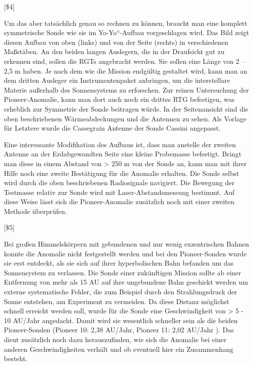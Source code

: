 \bigskip

[\$4]

Um das aber tats\"achlich genau so rechnen zu k\"onnen, braucht man
eine komplett symmetrische Sonde wie sie im
{\quotedblbase}Yo-Yo``-Aufbau vorgeschlagen wird. Das Bild zeigt diesen
Aufbau von oben (links) und von der Seite (rechts) in verschiedenen
Ma{\ss}st\"aben. An den beiden langen Auslegern, die in der Draufsicht
gut zu erkennen sind, sollen die RGTs ange\-bracht werden. Sie sollen
eine L\"ange von 2 -- 2,5 m haben. Je nach dem wie die Mission
endg\"ultig gestaltet wird, kann man an dem dritten Ausleger ein
Instrumentenpaket an\-bringen, um die interstellare Materie
au{\ss}erhalb des Sonnensystems zu erforschen. Zur rei\-nen
Untersuchung der Pioneer-Anomalie, kann man dort auch noch ein drittes
RTG befestigen, was erheblich zur Symmetrie der Sonde beitragen
w\"urde. In der Seitenansicht sind die oben beschriebenen
W\"armeabdeckungen und die Antennen zu sehen. Als Vorlage f\"ur
Letztere wurde die Cassegrain Antenne der Sonde Cassini angepasst.


\bigskip

Eine interessante Modifikation des Aufbaus ist, dass man anstelle der
zweiten Antenne an der Erdabgewandten Seite eine kleine Probemasse
befestigt. Bringt man diese in einem Abstand von {\textgreater} 250 m
von der Sonde an, kann man mit ihrer Hilfe noch eine zweite
Best\"a\-tigung f\"ur die Anomalie erhalten. Die Sonde selbst wird
durch die oben beschriebenen Ra\-diosignale navigiert. Die Bewegung der
Testmasse relativ zur Sonde wird mit Laser-Ab\-standsmessung bestimmt.
Auf diese Weise l\"asst sich die Pioneer-Anomalie zus\"atzlich noch mit
einer zweiten Methode \"uberpr\"ufen. 

[\$5]


\bigskip

Bei gro{\ss}en Himmelsk\"orpern mit gebundenen und nur wenig
exzentrischen Bahnen konnte die Anomalie nicht festgestellt werden und
bei den Pioneer-Sonden wurde sie erst ent\-deckt, als sie sich auf
ihrer hyperbolischen Bahn befanden um das Sonnensystem zu ver\-lassen.
Die Sonde einer zuk\"unftigen Mission sollte ab einer Entfernung von
mehr als 15 AU auf ihre ungebundene Bahn geschickt werden um externe
systematische Fehler, die zum Beispiel durch den Strahlungsdruck der
Sonne entstehen, am Experiment zu vermeiden. Da diese Distanz
m\"oglichst schnell erreicht werden soll, wurde f\"ur die Sonde eine
Ge\-schwindigkeit von {\textgreater} 5 - 10 AU/Jahr angedacht. Damit
wird sie wesentlich schneller sein als die beiden Pioneer-Sonden
(Pioneer 10: 2,38 AU/Jahr, Pioneer 11: 2,02 AU/Jahr ). Das dient
zus\"atzlich noch dazu herauszufinden, wie sich die Anomalie bei einer
anderen Ge\-schwindigkeiten verh\"alt und ob eventuell hier ein
Zusammenhang besteht.


